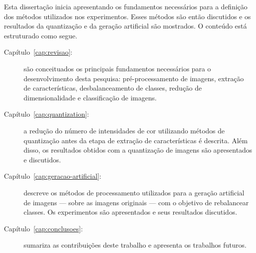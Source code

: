 Esta dissertação inicia apresentando os fundamentos necessários para a definição dos métodos utilizados nos experimentos. Esses métodos são então discutidos e os resultados da quantização e da geração artificial são mostrados. O conteúdo está estruturado como segue.

\begin{description}
\item [Capítulo~\ref{cap:revisao}:] são conceituados os principais fundamentos necessários para o desenvolvimento desta pesquisa: pré-processamento de imagens, extração de características, desbalanceamento de classes, redução de dimensionalidade e classificação de imagens.

\item [Capítulo~\ref{cap:quantization}:] a redução do número de intensidades de cor utilizando métodos de quantização antes da etapa de extração de características é descrita. Além disso, os resultados obtidos com a quantização de imagens são apresentados e discutidos.

\item [Capítulo~\ref{cap:geracao-artificial}:] descreve os métodos de processamento utilizados para a geração artificial de imagens --- sobre as imagens originais --- com o objetivo de rebalancear classes. Os experimentos são apresentados e seus resultados discutidos.

\item [Capítulo~\ref{cap:conclusoes}:] sumariza as contribuições deste trabalho e apresenta os trabalhos futuros.

\end{description}
